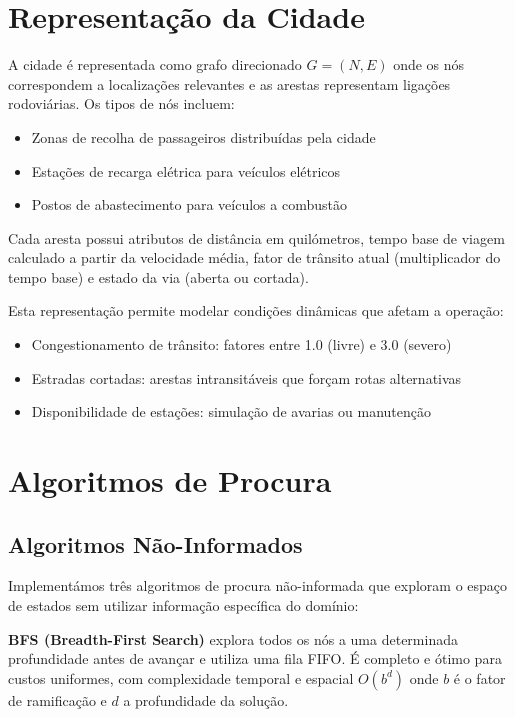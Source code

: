 \documentclass[11pt,a4paper]{article}
\begin{document}
\section{Representação da Cidade}

A cidade é representada como grafo direcionado $G = (N, E)$ onde os nós correspondem a localizações relevantes e as arestas representam ligações rodoviárias. Os tipos de nós incluem:
\begin{itemize}
    \item Zonas de recolha de passageiros distribuídas pela cidade
    \item Estações de recarga elétrica para veículos elétricos
    \item Postos de abastecimento para veículos a combustão
\end{itemize}

Cada aresta possui atributos de distância em quilómetros, tempo base de viagem calculado a partir da velocidade média, fator de trânsito atual (multiplicador do tempo base) e estado da via (aberta ou cortada).

Esta representação permite modelar condições dinâmicas que afetam a operação:
\begin{itemize}
    \item Congestionamento de trânsito: fatores entre 1.0 (livre) e 3.0 (severo)
    \item Estradas cortadas: arestas intransitáveis que forçam rotas alternativas
    \item Disponibilidade de estações: simulação de avarias ou manutenção
\end{itemize}

\section{Algoritmos de Procura}

\subsection{Algoritmos Não-Informados}

Implementámos três algoritmos de procura não-informada que exploram o espaço de estados sem utilizar informação específica do domínio:

\textbf{BFS (Breadth-First Search)} explora todos os nós a uma determinada profundidade antes de avançar e utiliza uma fila FIFO. É completo e ótimo para custos uniformes, com complexidade temporal e espacial $O(b^d)$ onde $b$ é o fator de ramificação e $d$ a profundidade da solução.
\end{document}
